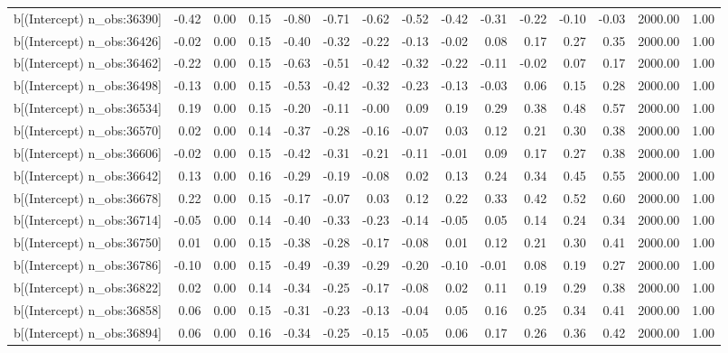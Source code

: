 \begin{table}[ht]
\begin{tabular}{rrrrrrrrrrrrrrr}
  b[(Intercept) n\_obs:36390] & -0.42 & 0.00 & 0.15 & -0.80 & -0.71 & -0.62 & -0.52 & -0.42 & -0.31 & -0.22 & -0.10 & -0.03 & 2000.00 & 1.00 \\ 
  b[(Intercept) n\_obs:36426] & -0.02 & 0.00 & 0.15 & -0.40 & -0.32 & -0.22 & -0.13 & -0.02 & 0.08 & 0.17 & 0.27 & 0.35 & 2000.00 & 1.00 \\ 
  b[(Intercept) n\_obs:36462] & -0.22 & 0.00 & 0.15 & -0.63 & -0.51 & -0.42 & -0.32 & -0.22 & -0.11 & -0.02 & 0.07 & 0.17 & 2000.00 & 1.00 \\ 
  b[(Intercept) n\_obs:36498] & -0.13 & 0.00 & 0.15 & -0.53 & -0.42 & -0.32 & -0.23 & -0.13 & -0.03 & 0.06 & 0.15 & 0.28 & 2000.00 & 1.00 \\ 
  b[(Intercept) n\_obs:36534] & 0.19 & 0.00 & 0.15 & -0.20 & -0.11 & -0.00 & 0.09 & 0.19 & 0.29 & 0.38 & 0.48 & 0.57 & 2000.00 & 1.00 \\ 
  b[(Intercept) n\_obs:36570] & 0.02 & 0.00 & 0.14 & -0.37 & -0.28 & -0.16 & -0.07 & 0.03 & 0.12 & 0.21 & 0.30 & 0.38 & 2000.00 & 1.00 \\ 
  b[(Intercept) n\_obs:36606] & -0.02 & 0.00 & 0.15 & -0.42 & -0.31 & -0.21 & -0.11 & -0.01 & 0.09 & 0.17 & 0.27 & 0.38 & 2000.00 & 1.00 \\ 
  b[(Intercept) n\_obs:36642] & 0.13 & 0.00 & 0.16 & -0.29 & -0.19 & -0.08 & 0.02 & 0.13 & 0.24 & 0.34 & 0.45 & 0.55 & 2000.00 & 1.00 \\ 
  b[(Intercept) n\_obs:36678] & 0.22 & 0.00 & 0.15 & -0.17 & -0.07 & 0.03 & 0.12 & 0.22 & 0.33 & 0.42 & 0.52 & 0.60 & 2000.00 & 1.00 \\ 
  b[(Intercept) n\_obs:36714] & -0.05 & 0.00 & 0.14 & -0.40 & -0.33 & -0.23 & -0.14 & -0.05 & 0.05 & 0.14 & 0.24 & 0.34 & 2000.00 & 1.00 \\ 
  b[(Intercept) n\_obs:36750] & 0.01 & 0.00 & 0.15 & -0.38 & -0.28 & -0.17 & -0.08 & 0.01 & 0.12 & 0.21 & 0.30 & 0.41 & 2000.00 & 1.00 \\ 
  b[(Intercept) n\_obs:36786] & -0.10 & 0.00 & 0.15 & -0.49 & -0.39 & -0.29 & -0.20 & -0.10 & -0.01 & 0.08 & 0.19 & 0.27 & 2000.00 & 1.00 \\ 
  b[(Intercept) n\_obs:36822] & 0.02 & 0.00 & 0.14 & -0.34 & -0.25 & -0.17 & -0.08 & 0.02 & 0.11 & 0.19 & 0.29 & 0.38 & 2000.00 & 1.00 \\ 
  b[(Intercept) n\_obs:36858] & 0.06 & 0.00 & 0.15 & -0.31 & -0.23 & -0.13 & -0.04 & 0.05 & 0.16 & 0.25 & 0.34 & 0.41 & 2000.00 & 1.00 \\ 
  b[(Intercept) n\_obs:36894] & 0.06 & 0.00 & 0.16 & -0.34 & -0.25 & -0.15 & -0.05 & 0.06 & 0.17 & 0.26 & 0.36 & 0.42 & 2000.00 & 1.00 \\ 

\end{tabular}
\end{table}
